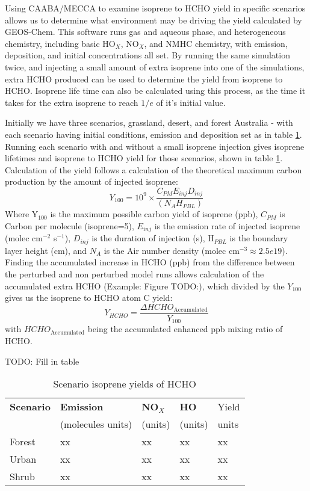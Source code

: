     Using CAABA/MECCA to examine isoprene to HCHO yield in specific scenarios allows us to determine what environment may be driving the yield calculated by GEOS-Chem.
    This software runs gas and aqueous phase, and heterogeneous chemistry, including basic HO$_X$, NO$_X$, and NMHC chemistry, with emission, deposition, and initial concentrations all set.
    By running the same simulation twice, and injecting a small amount of extra isoprene into one of the simulations, extra HCHO produced can be used to determine the yield from isoprene to HCHO.
    Isoprene life time can also be calculated using this process, as the time it takes for the extra isoprene to reach $1/e$ of it's initial value.
    
    Initially we have three scenarios, grassland, desert, and forest Australia - with each scenario having initial conditions, emission and deposition set as in table \ref{ch_isop:tab:CaabaMeccaScenarioYields}.
    Running each scenario with and without a small isoprene injection gives isoprene lifetimes and isoprene to HCHO yield for those scenarios, shown in table \ref{ch_isop:tab:CaabaMeccaScenarioYields}.
    Calculation of the yield follows a calculation of the theoretical maximum carbon production by the amount of injected isoprene:
    \begin{equation}
      Y_{100} =10^9 \times \frac{C_{PM} E_{inj} D_{inj}}{(N_A H_{PBL})}
    \end{equation}
    Where Y$_{100}$ is the maximum possible carbon yield of isoprene (ppb), $C_{PM}$ is Carbon per molecule (isoprene=5), $E_{inj}$ is the emission rate of injected isoprene (molec cm$^{-2}$ s$^{-1}$), $D_{inj}$ is the duration of injection (s), H$_{PBL}$ is the boundary layer height (cm), and $N_A$ is the Air number density (molec cm$^{-3} \approx 2.5e19$).
    Finding the accumulated increase in HCHO (ppb) from the difference between the perturbed and non perturbed model runs allows calculation of the accumulated extra HCHO (Example: Figure TODO:), which divided by the $Y_{100}$ gives us the isoprene to HCHO atom C yield:
    \begin{equation}
      Y_{HCHO}= \frac{\Delta HCHO_{\text{Accumulated}}}{Y_{100}}
    \end{equation}
    with $HCHO_{\text{Accumulated}}$ being the accumulated enhanced ppb mixing ratio of HCHO.
    
    TODO: Fill in table
    \begin{table}
    	\caption{Scenario isoprene yields of HCHO}
    	\begin{tabular}{ p{6cm} l  l  l  l }
    		\hline
    		\textbf{Scenario} & \textbf{Emission} & \textbf{NO$_X$} & \textbf{HO} & Yield \\
				    		  & (molecules units) & (units)         & (units)     & units \\ \hline
    		Forest 	& xx 	& xx 	& xx 	& xx  	\\ 
    		Urban 	& xx 	& xx 	& xx 	& xx 	\\
    		Shrub 	& xx 	& xx 	& xx 	& xx 	\\ \hline
    	\end{tabular}
    	\label{ch_isop:tab:CaabaMeccaScenarioYields}
    \end{table}
    
